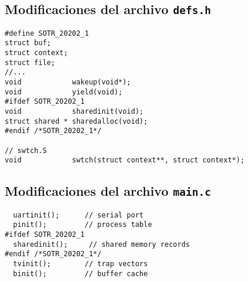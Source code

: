 \documentclass[12pt]{article}
\begin{document}
\subsection{Modif\/icaciones del archivo {\tt defs.h}}
\begin{verbatim}
#define SOTR_20202_1
struct buf;
struct context;
struct file;
//...
void            wakeup(void*);
void            yield(void);
#ifdef SOTR_20202_1
void            sharedinit(void);
struct shared * sharedalloc(void);
#endif /*SOTR_20202_1*/

// swtch.S
void            swtch(struct context**, struct context*);
\end{verbatim}
\subsection{Modif\/icaciones del archivo {\tt main.c}}
\begin{verbatim}
  uartinit();      // serial port
  pinit();         // process table
#ifdef SOTR_20202_1
  sharedinit();     // shared memory records
#endif /*SOTR_20202_1*/
  tvinit();        // trap vectors
  binit();         // buffer cache
\end{verbatim}
\end{document}
